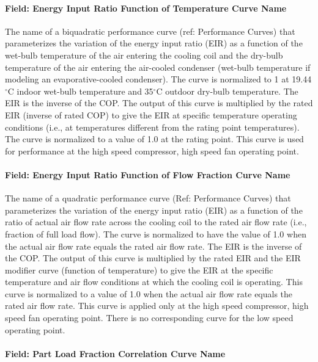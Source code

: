 \paragraph{Field: Energy Input Ratio Function of Temperature Curve Name}\label{field-energy-input-ratio-function-of-temperature-curve-name-1}

The name of a biquadratic performance curve (ref: Performance Curves) that parameterizes the variation of the energy input ratio (EIR) as a function of the wet-bulb temperature of the air entering the cooling coil and the dry-bulb temperature of the air entering the air-cooled condenser (wet-bulb temperature if modeling an evaporative-cooled condenser). The curve is normalized to 1 at 19.44$^\circ$C indoor wet-bulb temperature and 35$^\circ$C outdoor dry-bulb temperature. The EIR is the inverse of the COP. The output of this curve is multiplied by the rated EIR (inverse of rated COP) to give the EIR at specific temperature operating conditions (i.e., at temperatures different from the rating point temperatures). The curve is normalized to a value of 1.0 at the rating point. This curve is used for performance at the high speed compressor, high speed fan operating point.

\paragraph{Field: Energy Input Ratio Function of Flow Fraction Curve Name}\label{field-energy-input-ratio-function-of-flow-fraction-curve-name-1}

The name of a quadratic performance curve (Ref: Performance Curves) that parameterizes the variation of the energy input ratio (EIR) as a function of the ratio of actual air flow rate across the cooling coil to the rated air flow rate (i.e., fraction of full load flow). The curve is normalized to have the value of 1.0 when the actual air flow rate equals the rated air flow rate. The EIR is the inverse of the COP. The output of this curve is multiplied by the rated EIR and the EIR modifier curve (function of temperature) to give the EIR at the specific temperature and air flow conditions at which the cooling coil is operating. This curve is normalized to a value of 1.0 when the actual air flow rate equals the rated air flow rate. This curve is applied only at the high speed compressor, high speed fan operating point. There is no corresponding curve for the low speed operating point.

\paragraph{Field: Part Load Fraction Correlation Curve Name}\label{field-part-load-fraction-correlation-curve-name-3}

